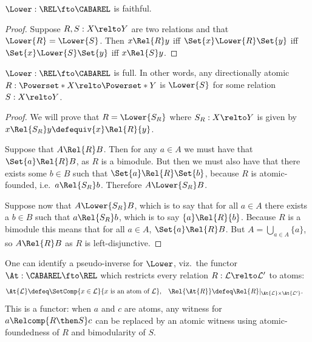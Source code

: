 \documentclass[a4paper,UKenglish,cleveref, autoref]{lipics-v2021}
\begin{document}
\begin{lemma}\label{lem:lower-faithful}
  \(\Lower : \REL \fto \CABAREL\) is faithful.
\end{lemma}
\begin{proof}
  Suppose \(R, S : X \relto Y\) are two relations and that
  \(\Lower{R} = \Lower{S}\). Then \(x \Rel{R} y\) iff
  \(\Set{x} \Lower{R} \Set{y}\) iff \(\Set{x} \Lower{S} \Set{y}\) iff
  \(x \Rel{S} y\).
\end{proof}

\begin{lemma}\label{lem:cabarel-then-lower}
  \(\Lower : \REL \fto \CABAREL\) is full. In other words, any
  directionally atomic \(R : \Powerset*{X} \relto \Powerset*{Y}\) is
  \(\Lower{S}\) for some relation \(S : X \relto Y \).
\end{lemma}
\begin{proof}
  We will prove that $R = \Lower{S_R}$ where $S_R : X \relto Y$ is given by \(x
  \Rel{S_R} y \defequiv \{ x \} \Rel{R} \{ y \}\).

  Suppose that \(A \Rel{R} B\). Then for any \(a \in A\) we must have that
  \(\Set{a} \Rel{R} B\), as \(R\) is a bimodule. But then we must also have that
  there exists some \(b \in B\) such that \(\Set{a} \Rel{R} \Set{b}\), because
  \(R\) is atomic-founded, i.e.\ $a \Rel{S_R} b$. Therefore \(A \Lower{S_R} B\).

  Suppose now that \(A \Lower{S_R} B\), which is to say that for all $a \in A$ there
  exists a $b \in B$ such that $a \Rel{S_R} b$, which is to say $\{a\} \Rel{R}
  \{b\}$. Because \(R\) is a bimodule this means that for all \(a \in A\),
  \(\Set{a} \Rel{R} B\). But $A = \bigcup_{a \in A} \{ a \}$, so \(A \Rel{R}
  B\) as \(R\) is left-disjunctive.
\end{proof}

One can identify a pseudo-inverse for \(\Lower\), viz.\ the functor \(\At :
\CABAREL \fto \REL\) which restricts every relation \(R : \mathcal{L} \relto
\mathcal{L}'\) to atoms:
\begin{align*}
  \At{\mathcal{L}} &\defeq \SetComp{x \in \mathcal{L}}{x \text{ is an atom of }
                     \mathcal{L}},
  &
    \Rel{\At{R}} &\defeq \Rel{R}|_{\At{\mathcal{L}} \times \At{\mathcal{L}'}}.
\end{align*}
This is a functor: when \(a\) and \(c\) are atoms, any witness for
\(a \Relcomp{R \then S} c\) can be replaced by an atomic witness using
atomic-foundedness of \(R\) and bimodularity of \(S\).
\end{document}
